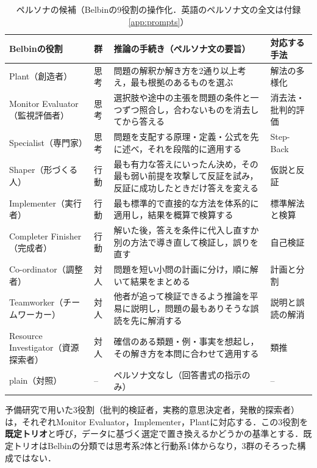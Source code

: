 \begin{table}[htbp]
\caption{ペルソナの候補（Belbinの9役割の操作化．英語のペルソナ文の全文は付録\ref{app:prompts}）}
\label{tab:3.2}
\centering
\footnotesize
\setlength{\tabcolsep}{3pt}
\begin{tabular}{|p{3.4cm}|p{0.8cm}|p{6.2cm}|p{2.6cm}|}
\hline
Belbinの役割 & 群 & 推論の手続き（ペルソナ文の要旨） & 対応する手法 \\
\hline
Plant（創造者） & 思考 & 問題の解釈か解き方を2通り以上考え，最も根拠のあるものを選ぶ & 解法の多様化\cite{liu2025dmad} \\
\hline
Monitor Evaluator（監視評価者） & 思考 & 選択肢や途中の主張を問題の条件と一つずつ照合し，合わないものを消去してから答える & 消去法・批判的評価 \\
\hline
Specialist（専門家） & 思考 & 問題を支配する原理・定義・公式を先に述べ，それを段階的に適用する & Step-Back\cite{zheng2024stepback} \\
\hline
Shaper（形づくる人） & 行動 & 最も有力な答えにいったん決め，その最も弱い前提を攻撃して反証を試み，反証に成功したときだけ答えを変える & 仮説と反証 \\
\hline
Implementer（実行者） & 行動 & 最も標準的で直接的な方法を体系的に適用し，結果を概算で検算する & 標準解法と検算 \\
\hline
Completer Finisher（完成者） & 行動 & 解いた後，答えを条件に代入し直すか別の方法で導き直して検証し，誤りを直す & 自己検証\cite{weng2023large} \\
\hline
Co-ordinator（調整者） & 対人 & 問題を短い小問の計画に分け，順に解いて結果をまとめる & 計画と分割\cite{wang2023plan,zhou2023least} \\
\hline
Teamworker（チームワーカー） & 対人 & 他者が追って検証できるよう推論を平易に説明し，問題の最もありそうな誤読を先に解消する & 説明と誤読の解消 \\
\hline
Resource Investigator（資源探索者） & 対人 & 確信のある類題・例・事実を想起し，その解き方を本問に合わせて適用する & 類推\cite{yasunaga2024analogical} \\
\hline
plain（対照） & -- & ペルソナ文なし（回答書式の指示のみ） & -- \\
\hline
\end{tabular}
\end{table}

予備研究で用いた3役割（批判的検証者，実務的意思決定者，発散的探索者）は，それぞれMonitor Evaluator，Implementer，Plantに対応する．この3役割を\textbf{既定トリオ}と呼び，データに基づく選定で置き換えるかどうかの基準とする．既定トリオはBelbinの分類では思考系2体と行動系1体からなり，3群のそろった構成ではない．

